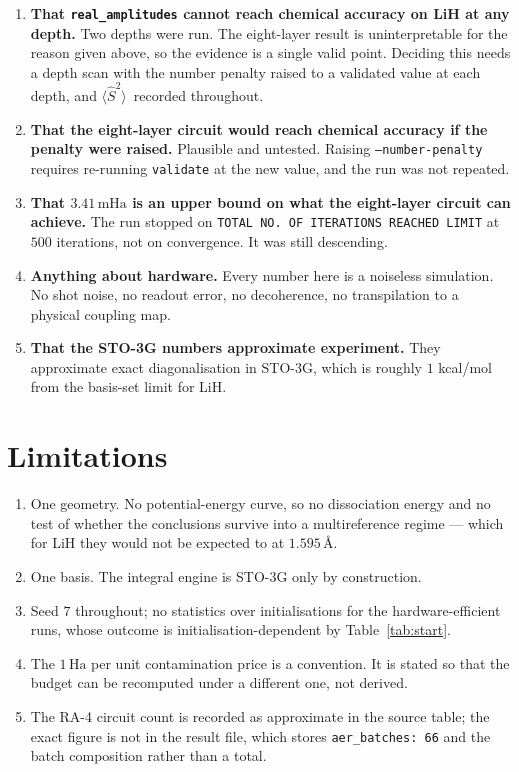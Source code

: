 \documentclass[11pt,a4paper]{article}
\newcommand{\mHa}{\ensuremath{\,\mathrm{mHa}}}
\newcommand{\Ha}{\ensuremath{\,\mathrm{Ha}}}
\newcommand{\Ang}{\ensuremath{\,\text{\AA}}}
\newcommand{\Ssq}{\ensuremath{\langle \hat{S}^2 \rangle}}
\newcommand{\code}[1]{\texttt{\small #1}}
\begin{document}
\begin{enumerate}[leftmargin=1.4em,itemsep=0.3em]

\item \textbf{That \code{real\_amplitudes} cannot reach chemical accuracy on
  LiH at any depth.} Two depths were run. The eight-layer result is
  uninterpretable for the reason given above, so the evidence is a single valid
  point. Deciding this needs a depth scan with the number penalty raised to a
  validated value at each depth, and \Ssq\ recorded throughout.

\item \textbf{That the eight-layer circuit would reach chemical accuracy if the
  penalty were raised.} Plausible and untested. Raising \code{--number-penalty}
  requires re-running \code{validate} at the new value, and the run was not
  repeated.

\item \textbf{That $3.41\mHa$ is an upper bound on what the eight-layer circuit
  can achieve.} The run stopped on \code{TOTAL NO. OF ITERATIONS REACHED LIMIT}
  at $500$ iterations, not on convergence. It was still descending.

\item \textbf{Anything about hardware.} Every number here is a noiseless
  simulation. No shot noise, no readout error, no decoherence, no transpilation
  to a physical coupling map.

\item \textbf{That the STO-3G numbers approximate experiment.} They approximate
  exact diagonalisation in STO-3G, which is roughly $1$ kcal/mol from the
  basis-set limit for LiH.

\end{enumerate}

\section{Limitations}

\begin{enumerate}[leftmargin=1.4em,itemsep=0.2em]
\item One geometry. No potential-energy curve, so no dissociation energy and no
  test of whether the conclusions survive into a multireference regime --- which
  for LiH they would not be expected to at $1.595\Ang$.
\item One basis. The integral engine is STO-3G only by construction.
\item Seed $7$ throughout; no statistics over initialisations for the
  hardware-efficient runs, whose outcome is initialisation-dependent by
  Table~\ref{tab:start}.
\item The $1\Ha$ per unit contamination price is a convention. It is stated so
  that the budget can be recomputed under a different one, not derived.
\item The RA-4 circuit count is recorded as approximate in the source table;
  the exact figure is not in the result file, which stores
  \code{aer\_batches: 66} and the batch composition rather than a total.
\end{enumerate}
\end{document}
